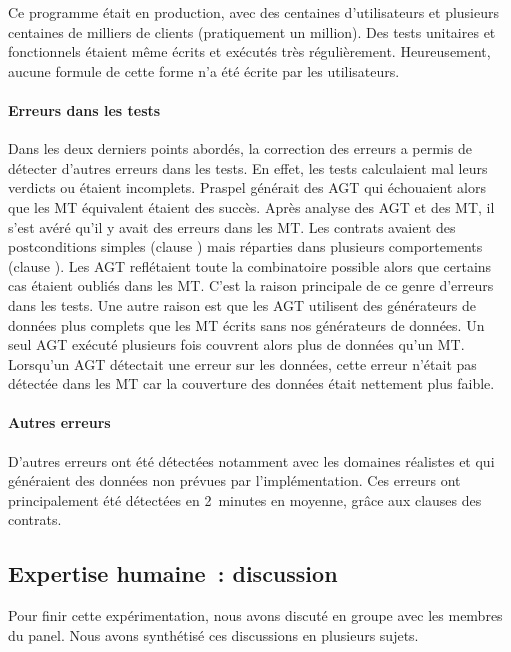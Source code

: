 Ce programme était en production, avec des centaines d'utilisateurs et plusieurs
centaines de milliers de clients (pratiquement un million). Des tests unitaires
et fonctionnels étaient même écrits et exécutés très régulièrement.
Heureusement, aucune formule de cette forme n'a été écrite par les utilisateurs.

\paragraph{Erreurs dans les tests} Dans les deux derniers points abordés, la
correction des erreurs a permis de détecter d'autres erreurs dans les tests. En
effet, les tests calculaient mal leurs verdicts ou étaient incomplets. Praspel
générait des AGT qui échouaient alors que les MT équivalent étaient des succès.
Après analyse des AGT et des MT, il s'est avéré qu'il y avait des erreurs dans
les MT. Les contrats avaient des postconditions simples (clause \aensures) mais
réparties dans plusieurs comportements (clause \abehavior). Les AGT reflétaient
toute la combinatoire possible alors que certains cas étaient oubliés dans les
MT. C'est la raison principale de ce genre d'erreurs dans les tests. Une autre
raison est que les AGT utilisent des générateurs de données plus complets que
les MT écrits sans nos générateurs de données. Un seul AGT exécuté plusieurs
fois couvrent alors plus de données qu'un MT. Lorsqu'un AGT détectait une erreur
sur les données, cette erreur n'était pas détectée dans les MT car la couverture
des données était nettement plus faible.

\paragraph{Autres erreurs} D'autres erreurs ont été détectées notamment avec les
domaines réalistes  et  qui généraient des données non
prévues par l'implémentation. Ces erreurs ont principalement été détectées en
2~minutes en moyenne, grâce aux clauses \aensures des contrats.

\subsection{Expertise humaine~: discussion}
\label{subsection:experimentation:discuss}

Pour finir cette expérimentation, nous avons discuté en groupe avec les membres
du panel. Nous avons synthétisé ces discussions en plusieurs sujets.

